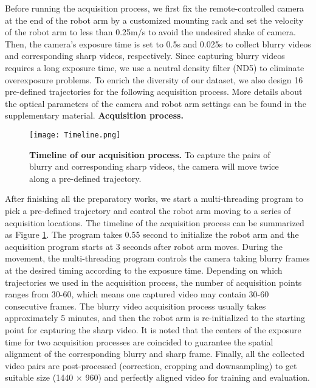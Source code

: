 \documentclass[letterpaper]{article} \usepackage{aaai22}  \usepackage{times}  \usepackage{helvet}  \usepackage{courier}  \usepackage[hyphens]{url}  \usepackage{graphicx} \urlstyle{rm} \def\UrlFont{\rm}  \usepackage{natbib}  \usepackage{caption} \DeclareCaptionStyle{ruled}{labelfont=normalfont,labelsep=colon,strut=off} \frenchspacing  \setlength{\pdfpagewidth}{8.5in}  \setlength{\pdfpageheight}{11in}  \newcommand{\hang}{\textcolor[rgb]{0.98,0.5,0.04}}
\begin{document}
Before running the acquisition process, we first fix the remote-controlled camera at the end of the robot arm by a customized mounting rack and set the velocity of the robot arm to less than 0.25m/s to avoid the undesired shake of camera.
Then, the camera's exposure time is set to 0.5s and 0.025s to collect blurry videos and corresponding sharp videos, respectively. 
Since capturing blurry videos requires a long exposure time, we use a neutral density filter (ND5) to eliminate overexposure problems.
To enrich the diversity of our dataset, we also design 16 pre-defined trajectories for the following acquisition process.
More details about the optical parameters of the camera and robot arm settings can be found in the supplementary material.
\newline
{\bf Acquisition process.}  \begin{figure}[!t] 
  \centering
  \texttt{[image: Timeline.png]}
  \vspace{-2mm}
  \caption{\textbf{Timeline of our acquisition process.} To capture the pairs of blurry and corresponding sharp videos, the camera will move twice along a pre-defined trajectory.}
\label{fig:Video_Timeline}
\vspace{-6mm}
\end{figure}
After finishing all the preparatory works, we start a multi-threading program to pick a pre-defined trajectory and control the robot arm moving to a series of acquisition locations.
The timeline of the acquisition process can be summarized as Figure \ref{fig:Video_Timeline}.
The program takes 0.55 second to initialize the robot arm and the acquisition program starts at 3 seconds after robot arm moves.
During the movement, the multi-threading program controls the camera taking blurry frames at the desired timing according to the exposure time.
Depending on which trajectories we used in the acquisition process, the number of acquisition points ranges from 30-60, which means one captured video may contain 30-60 consecutive frames.
The blurry video acquisition process usually takes approximately 5 minutes, and then the robot arm is re-initialized to the starting point for capturing the sharp video.
It is noted that the centers of the exposure time for two acquisition processes are coincided to guarantee the spatial alignment of the corresponding blurry and sharp frame. 
Finally, all the collected video pairs are post-processed (correction, cropping and downsampling) to get suitable size (1440 $\times$ 960) and perfectly aligned video for training and evaluation.
\end{document}
